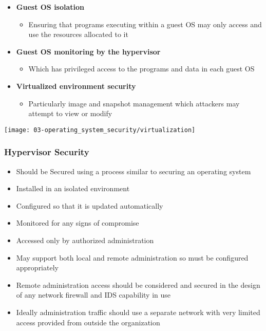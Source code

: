 \begin{minipage}{0.5\linewidth}
    \begin{itemize}
        \item \textbf{Guest OS isolation}
        \begin{itemize}
            \item Ensuring that programs executing within a guest OS may only access and use the resources allocated to it
        \end{itemize}
        \item \textbf{Guest OS monitoring by the hypervisor}
        \begin{itemize}
            \item Which has privileged access to the programs and data in each guest OS
        \end{itemize}
        \item \textbf{Virtualized environment security}
        \begin{itemize}
            \item Particularly image and snapshot management which attackers may attempt to view or modify
        \end{itemize}
    \end{itemize}
\end{minipage}
\begin{minipage}{0.45\linewidth}
    \begin{center}
        \texttt{[image: 03-operating\_system\_security/virtualization]}
        \vspace{-8pt}
    \end{center}
\end{minipage}

\subsubsection{Hypervisor Security}
\begin{itemize}
    \item Should be Secured using a process similar to securing an operating system
    \item Installed in an isolated environment
    \item Configured so that it is updated automatically
    \item Monitored for any signs of compromise
    \item Accessed only by authorized administration
    \item May support both local and remote administration so must be configured appropriately
    \item Remote administration access should be considered and secured in the design of any network firewall and IDS capability in use
    \item Ideally administration traffic should use a separate network with very limited access provided from outside the organization
\end{itemize}

